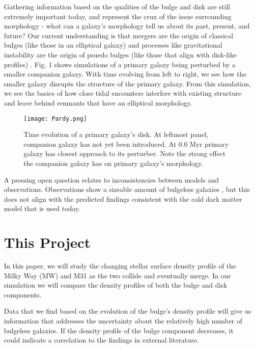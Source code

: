 \documentclass[linenumbers,trackchanges,twocolumn]{aastex7}
\begin{document}
Gathering information based on the qualities of the bulge and disk are still extremely important today, and represent the crux of the issue surrounding morphology - what can a galaxy's morphology tell us about its past, present, and future? Our current understanding is that mergers are the origin of classical bulges (like those in an elliptical galaxy) and processes like gravitational instability are the origin of psuedo bulges (like those that align with disk-like profiles) \citep{Kannan2015}. Fig. 1 shows simulations of a primary galaxy being perturbed by a smaller companion galaxy. With time evolving from left to right, we see how the smaller galaxy disrupts the structure of the primary galaxy. From this simulation, we see the basics of how close tidal encounters interfere with existing structure and leave behind remnants that have an elliptical morphology.
 
\begin{figure}[ht!]
\centering
\texttt{[image: Pardy.png]}
\caption{Time evolution of a primary galaxy's disk. At leftmost panel, companion galaxy has not yet been introduced. At 0.0 Myr primary galaxy has closest approach to its perturber. Note the strong effect the companion galaxy has on primary galaxy's morphology.\citep{Pardy2016}}
\label{fig:general}
\end{figure}

A pressing open question relates to inconsistencies between models and observations. Observations show a sizeable amount of bulgeless galaxies \citep{Kannan2015}, but this does not align with the predicted findings consistent with the cold dark matter model that is used today.



\section{This Project} \label{sec:style}

In this paper, we will study the changing stellar surface density profile of the Milky Way (MW) and M31 as the two collide and eventually merge. In our simulation we will compare the density profiles of both the bulge and disk components.

Data that we find based on the evolution of the bulge's density profile will give us information that addresses the uncertainty about the relatively high number of bulgeless galaxies. If the density profile of the bulge component decreases, it could indicate a correlation to the findings in external literature. 
\end{document}
